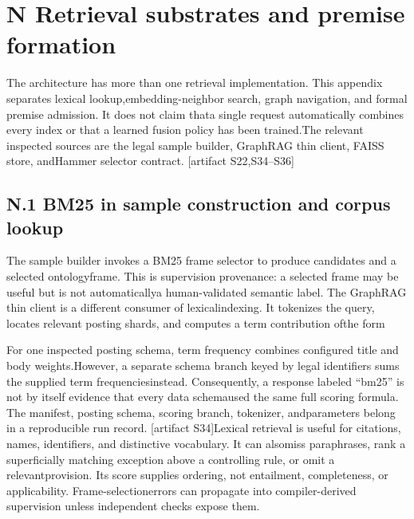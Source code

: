 \section*{N  Retrieval substrates and premise formation}
\noindent
The architecture has more than one retrieval implementation. This appendix separates lexical lookup,\linebreak[4]
embedding-neighbor search, graph navigation, and formal premise admission. It does not claim that\linebreak[4]
a single request automatically combines every index or that a learned fusion policy has been trained.\linebreak[4]
The relevant inspected sources are the legal sample builder, GraphRAG thin client, FAISS store, and\linebreak[4]
Hammer selector contract. [artifact S22,S34--S36]\par

\subsection*{N.1  BM25 in sample construction and corpus lookup}
\noindent
The sample builder invokes a BM25 frame selector to produce candidates and a selected ontology\linebreak[4]
frame. This is supervision provenance: a selected frame may be useful but is not automatically\linebreak[4]
a human-validated semantic label. The GraphRAG thin client is a different consumer of lexical\linebreak[4]
indexing. It tokenizes the query, locates relevant posting shards, and computes a term contribution of\linebreak[4]
the form\par


\noindent
For one inspected posting schema, term frequency combines configured title and body weights.\linebreak[4]
However, a separate schema branch keyed by legal identifiers sums the supplied term frequencies\linebreak[4]
instead. Consequently, a response labeled ``bm25'' is not by itself evidence that every data schema\linebreak[4]
used the same full scoring formula. The manifest, posting schema, scoring branch, tokenizer, and\linebreak[4]
parameters belong in a reproducible run record. [artifact S34]\linebreak[4]
Lexical retrieval is useful for citations, names, identifiers, and distinctive vocabulary. It can also\linebreak[4]
miss paraphrases, rank a superficially matching exception above a controlling rule, or omit a relevant\linebreak[4]
provision. Its score supplies ordering, not entailment, completeness, or applicability. Frame-selection\linebreak[4]
errors can propagate into compiler-derived supervision unless independent checks expose them.\par

